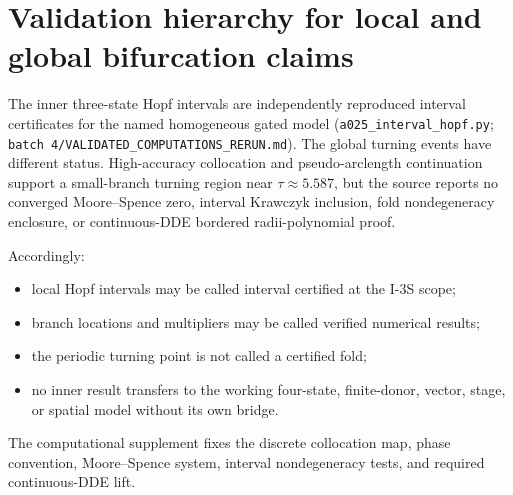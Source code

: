 \documentclass[11pt]{article}
\theoremstyle{definition}
\begin{document}
\section{Validation hierarchy for local and global bifurcation claims}
\label{sec:validation-bridge}

The inner three-state Hopf intervals are independently reproduced interval certificates for the named homogeneous gated model (\texttt{a025\_interval\_hopf.py}; \texttt{batch 4/VALIDATED\_COMPUTATIONS\_RERUN.md}). The global turning events have different status. High-accuracy collocation and pseudo-arclength continuation support a small-branch turning region near $\tau\approx5.587$, but the source reports no converged Moore--Spence zero, interval Krawczyk inclusion, fold nondegeneracy enclosure, or continuous-DDE bordered radii-polynomial proof.

Accordingly:
\begin{itemize}
\item local Hopf intervals may be called interval certified at the I-3S scope;
\item branch locations and multipliers may be called verified numerical results;
\item the periodic turning point is not called a certified fold;
\item no inner result transfers to the working four-state, finite-donor, vector, stage, or spatial model without its own bridge.
\end{itemize}

The computational supplement fixes the discrete collocation map, phase convention, Moore--Spence system, interval nondegeneracy tests, and required continuous-DDE lift.
\end{document}
